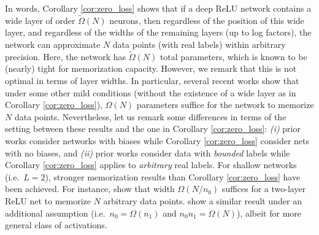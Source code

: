 \documentclass[11pt]{article}
\begin{document}

In words, Corollary \ref{cor:zero_loss} shows that if a deep ReLU network contains a wide layer of order $\tilde{\Omega}(N)$ neurons,
then regardless of the position of this wide layer, and regardless of the widths of the remaining layers (up to log factors),
the network can approximate $N$ data points (with real labels) within arbitrary precision.
Here, the network has $\tilde{\Omega}(N)$ total parameters, which is known to be (nearly) tight for memorization capacity.
However, we remark that this is not optimal in terms of layer widths.
In particular, several recent works \citep{bartlett2019nearly,ge2019mildly,vershynin2020memory,yun2019small} 
show that under some other mild conditions (without the existence of a wide layer as in Corollary \ref{cor:zero_loss}),
$\Omega(N)$ parameters suffice for the network to memorize $N$ data points.
Nevertheless, let us remark some differences in terms of the setting between these results and the one in Corollary \ref{cor:zero_loss}:
\emph{(i)} prior works consider networks with biases while Corollary \ref{cor:zero_loss} consider nets with no biases, and 
\emph{(ii)} prior works consider data with {\em bounded} labels while Corollary \ref{cor:zero_loss} applies to {\em arbitrary} real labels.
For shallow networks (i.e.\ $L=2$), stronger memorization results than Corollary \ref{cor:zero_loss} have been achieved.
For instance, \citep{bubeck2020network} show that width $\Omega(N/n_0)$ suffices for a two-layer ReLU net to memorize $N$ arbitrary data points.
\citep{Andrea2020} show a similar result under an additional assumption (i.e.\ $n_0=\Omega(n_1)$ and $n_0n_1=\Omega(N)$), albeit for more general class of activations.
\end{document}
